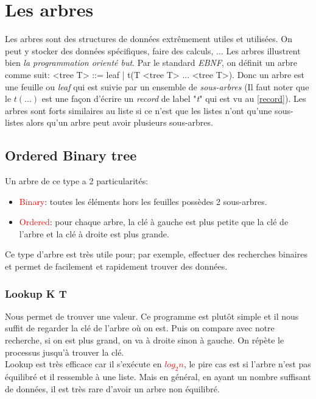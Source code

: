 \documentclass{report}
\begin{document}
\section{Les arbres}
Les arbres sont des structures de données extrêmement utiles et utilisées. On peut y stocker des données spécifiques, faire des calculs, ... Les arbres illustrent bien \textit{la programmation orienté but}. Par le standard \textit{EBNF}, on définit un arbre comme suit: <tree T> ::= leaf | t(T <tree T> ... <tree T>). Donc un arbre est une feuille ou \textit{leaf} qui est suivie par un ensemble de \textit{sous-arbres} (Il faut noter que le $t(...)$ est une façon d'écrire un \textit{record} de label "\textit{t}" qui est vu au \ref{record}). Les arbres sont forts similaires au liste si ce n'est que les listes n'ont qu'une sous-listes alors qu'un arbre peut avoir plusieurs sous-arbres.

\subsection{Ordered Binary tree}
Un arbre de ce type a 2 particularités:
\begin{itemize}
\item \textcolor{red}{Binary}: toutes les éléments hors les feuilles possèdes 2 sous-arbres.
\item \textcolor{red}{Ordered}: pour chaque arbre, la clé à gauche est plus petite que la clé de l'arbre et la clé à droite est plus grande.
\end{itemize}
Ce type d'arbre est très utile pour; par exemple, effectuer des recherches binaires et permet de facilement et rapidement trouver des données.

\subsubsection{Lookup K T}
Nous permet de trouver une valeur. Ce programme est plutôt simple et il nous suffit de regarder la clé de l'arbre où on est. Puis on compare avec notre recherche, si on est plus grand, on va à droite sinon à gauche. On répète le processus jusqu'à trouver la clé.\\
Lookup est très efficace car il s'exécute en \textcolor{red}{$log_2 n$}, le pire cas est si l'arbre n'est pas équilibré et il ressemble à une liste. Mais en général, en ayant un nombre suffisant de données, il est très rare d'avoir un arbre non équilibré.
\end{document}
